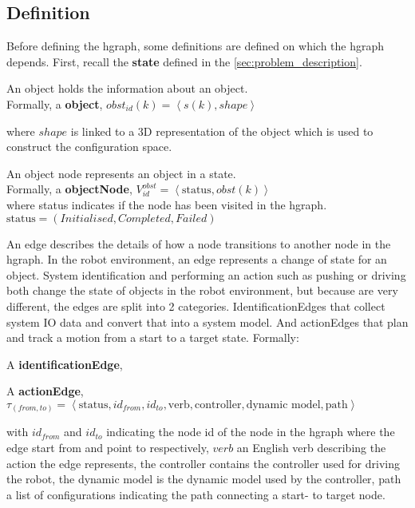 \subsection{Definition}%
\label{subsec:hgraph_definition}%
Before defining the \ac{hgraph}, some definitions are defined on which the \ac{hgraph} depends. First, recall the \textbf{state} defined in the \cref{sec:problem_description}.\bs

An object holds the information about an object.\\Formally, a \textbf{object},  $obst_{id}(k) = \left\langle s(k), shape \right\rangle $\bs

where $shape$ is linked to a 3D representation of the object which is used to construct the configuration space.\bs

An object node represents an object in a state.\\Formally, a \textbf{objectNode}, $V^{obst}_{id} =\left\langle \textrm{status}, obst(k)\right\rangle $\\where status indicates if the node has been visited in the \ac{hgraph}. $\textrm{status} = (Initialised, Completed, Failed)$\bs

An edge describes the details of how a node transitions to another node in the \ac{hgraph}. In the robot environment, an edge represents a change of state for an object. System identification and performing an action such as pushing or driving both change the state of objects in the robot environment, but because are very different, the edges are split into 2 categories. IdentificationEdges that collect system \ac{IO} data and convert that into a system model. And actionEdges that plan and track a motion from a start to a target state. Formally:\bs

A \textbf{identificationEdge},

A \textbf{actionEdge}, $\tau_{(from, to)} = \left\langle \textrm{status}, id_{from}, id_{to}, \textrm{verb}, \textrm{controller},\textrm{dynamic model}, \textrm{path}\right\rangle$\bs

with $id_{from}$ and $id_{to}$ indicating the node id of the node in the \ac{hgraph} where the edge start from and point to respectively, $verb$ an English verb describing the action the edge represents, the controller contains the controller used for driving the robot, the dynamic model is the dynamic model used by the controller, path a list of configurations indicating the path connecting a start- to target node.\bs

